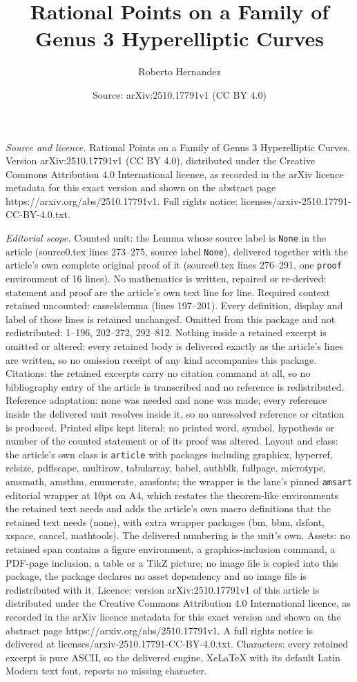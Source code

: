 \documentclass[10pt,a4paper]{amsart}
\title[Rational Points on a Family of Genus 3 Hyperelliptic Curves]{Rational Points on a Family of Genus 3 Hyperelliptic Curves}
\author{Roberto Hernandez}
\date{Source: arXiv:2510.17791v1 (CC BY 4.0)}
\begin{document}
\maketitle

\noindent\emph{Source and licence.} Rational Points on a Family of Genus 3 Hyperelliptic Curves. Version arXiv:2510.17791v1 (CC BY 4.0), distributed under the Creative Commons Attribution 4.0 International licence, as recorded in the arXiv licence metadata for this exact version and shown on the abstract page https://arxiv.org/abs/2510.17791v1. Full rights notice: licenses/arxiv-2510.17791-CC-BY-4.0.txt.\par\smallskip

\noindent\textit{Editorial scope.} Counted unit: the Lemma whose source label is \texttt{None} in the article (source0.tex lines 273--275, source label \texttt{None}), delivered together with the article's own complete original proof of it (source0.tex lines 276--291, one \texttt{proof} environment of 16 lines). No mathematics is written, repaired or re-derived: statement and proof are the article's own text line for line. Required context retained uncounted: casselslemma (lines 197--201). Every definition, display and label of those lines is retained unchanged. Omitted from this package and not redistributed: 1--196, 202--272, 292--812. Nothing inside a retained excerpt is omitted or altered: every retained body is delivered exactly as the article's lines are written, so no omission receipt of any kind accompanies this package. Citations: the retained excerpts carry no citation command at all, so no bibliography entry of the article is transcribed and no reference is redistributed. Reference adaptation: none was needed and none was made; every reference inside the delivered unit resolves inside it, so no unresolved reference or citation is produced. Printed slips kept literal: no printed word, symbol, hypothesis or number of the counted statement or of its proof was altered. Layout and class: the article's own class is \texttt{article} with packages including graphicx, hyperref, relsize, pdflscape, multirow, tabularray, babel, authblk, fullpage, microtype, amsmath, amsthm, enumerate, amsfonts; the wrapper is the lane's pinned \texttt{amsart} editorial wrapper at 10pt on A4, which restates the theorem-like environments the retained text needs and adds the article's own macro definitions that the retained text needs (none), with extra wrapper packages (bm, bbm, dsfont, xspace, cancel, mathtools). The delivered numbering is the unit's own. Assets: no retained span contains a figure environment, a graphics-inclusion command, a PDF-page inclusion, a table or a TikZ picture; no image file is copied into this package, the package declares no asset dependency and no image file is redistributed with it. Licence: version arXiv:2510.17791v1 of this article is distributed under the Creative Commons Attribution 4.0 International licence, as recorded in the arXiv licence metadata for this exact version and shown on the abstract page https://arxiv.org/abs/2510.17791v1. A full rights notice is delivered at licenses/arxiv-2510.17791-CC-BY-4.0.txt. Characters: every retained excerpt is pure ASCII, so the delivered engine, XeLaTeX with its default Latin Modern text font, reports no missing character.
\end{document}
